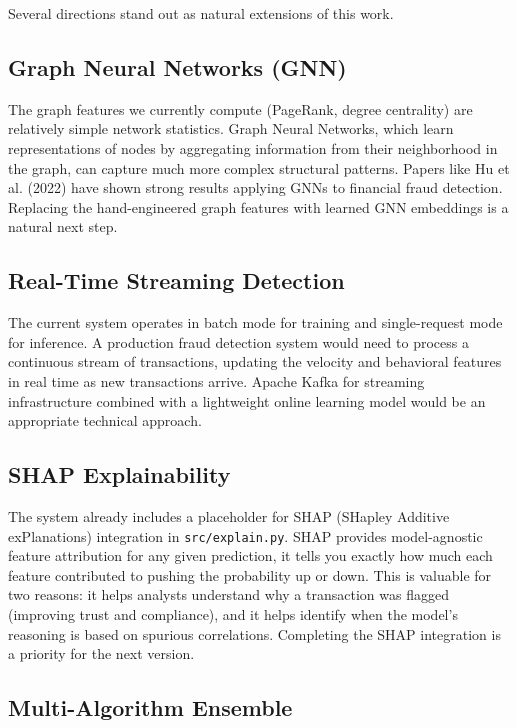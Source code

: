 Several directions stand out as natural extensions of this work.

\subsection{Graph Neural Networks (GNN)}

The graph features we currently compute (PageRank, degree centrality) are relatively simple network statistics. Graph Neural Networks, which learn representations of nodes by aggregating information from their neighborhood in the graph, can capture much more complex structural patterns. Papers like Hu et al. (2022) \cite{hu2022} have shown strong results applying GNNs to financial fraud detection. Replacing the hand-engineered graph features with learned GNN embeddings is a natural next step.

\subsection{Real-Time Streaming Detection}

The current system operates in batch mode for training and single-request mode for inference. A production fraud detection system would need to process a continuous stream of transactions, updating the velocity and behavioral features in real time as new transactions arrive. Apache Kafka for streaming infrastructure combined with a lightweight online learning model would be an appropriate technical approach.

\subsection{SHAP Explainability}

The system already includes a placeholder for SHAP (SHapley Additive exPlanations) integration in \texttt{src/explain.py}. SHAP provides model-agnostic feature attribution for any given prediction, it tells you exactly how much each feature contributed to pushing the probability up or down. This is valuable for two reasons: it helps analysts understand why a transaction was flagged (improving trust and compliance), and it helps identify when the model's reasoning is based on spurious correlations. Completing the SHAP integration is a priority for the next version.

\subsection{Multi-Algorithm Ensemble}

